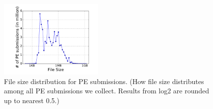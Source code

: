 \begin{figure}[t!]
\begin{center}
\includegraphics[width=2in]{figure/pesize}
\caption{File size distribution for PE submissions.
(How file size distributes among all PE submissions we collect. 
Results from log2 are rounded up to nearest 0.5.)
}
\label{fig:pesize}
\end{center}
\end{figure}